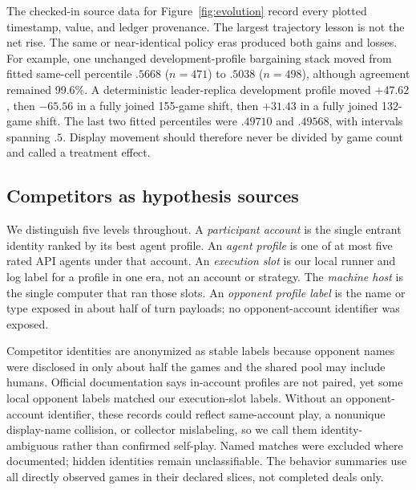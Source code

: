 The checked-in source data for Figure~\ref{fig:evolution} record every plotted
timestamp, value, and ledger provenance. The largest trajectory lesson is not
the net rise. The same or near-identical policy eras produced both gains and
losses. For example, one unchanged development-profile bargaining stack moved from fitted
same-cell percentile $.5668$ ($n=471$) to $.5038$ ($n=498$), although
agreement remained 99.6\%. A deterministic leader-replica development profile moved
$+47.62$, then $-65.56$ in a fully joined 155-game shift, then $+31.43$ in a
fully joined 132-game shift. The last two fitted percentiles were $.49710$ and
$.49568$, with intervals spanning $.5$. Display movement should therefore
never be divided by game count and called a treatment effect.

\subsection{Competitors as hypothesis sources}

We distinguish five levels throughout. A \emph{participant account} is the
single entrant identity ranked by its best agent profile. An \emph{agent
profile} is one of at most five rated API agents under that account. An
\emph{execution slot} is our local runner and log label for a profile in one
era, not an account or strategy. The \emph{machine host} is the single computer
that ran those slots. An \emph{opponent profile label} is the name or type
exposed in about half of turn payloads; no opponent-account identifier was
exposed.

Competitor identities are anonymized as stable labels because opponent names
were disclosed in only about half the games and the shared pool may include
humans. Official documentation says in-account profiles are not paired, yet
some local opponent labels matched our execution-slot labels. Without an
opponent-account identifier, these records could reflect same-account play, a
nonunique display-name collision, or collector mislabeling, so we call them
identity-ambiguous rather than confirmed self-play. Named matches were excluded
where documented; hidden identities remain unclassifiable. The behavior summaries use
all directly observed games in their declared slices, not completed deals only.

